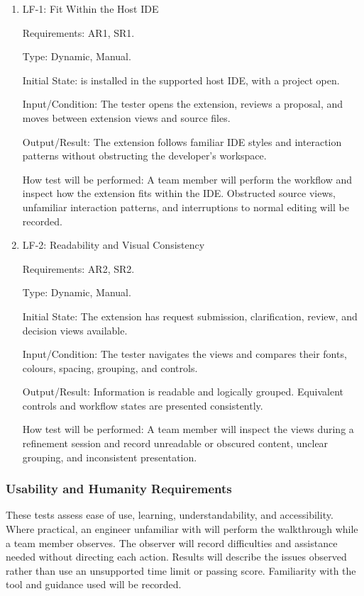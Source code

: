 \documentclass[12pt, titlepage]{article}
\begin{document}
\begin{enumerate}

\item{LF-1: Fit Within the Host IDE\\}

Requirements: AR1, SR1.

Type: Dynamic, Manual.

Initial State: \progname{} is installed in the supported host IDE, with a
project open.

Input/Condition: The tester opens the extension, reviews a proposal, and moves
between extension views and source files.

Output/Result: The extension follows familiar IDE styles and interaction
patterns without obstructing the developer's workspace.

How test will be performed: A team member will perform the workflow and
inspect how the extension fits within the IDE. Obstructed source views,
unfamiliar interaction patterns, and interruptions to normal editing will be
recorded.

\item{LF-2: Readability and Visual Consistency\\}

Requirements: AR2, SR2.

Type: Dynamic, Manual.

Initial State: The extension has request submission, clarification, review,
and decision views available.

Input/Condition: The tester navigates the views and compares their fonts,
colours, spacing, grouping, and controls.

Output/Result: Information is readable and logically grouped. Equivalent
controls and workflow states are presented consistently.

How test will be performed: A team member will inspect the views during a
refinement session and record unreadable or obscured content, unclear
grouping, and inconsistent presentation.

\end{enumerate}

\subsubsection{Usability and Humanity Requirements}

These tests assess ease of use, learning, understandability, and
accessibility. Where practical, an engineer unfamiliar with \progname{} will
perform the walkthrough while a team member observes. The observer will record
difficulties and assistance needed without directing each action. Results will
describe the issues observed rather than use an unsupported time limit or
passing score. Familiarity with the tool and guidance used will be recorded.
\end{document}
